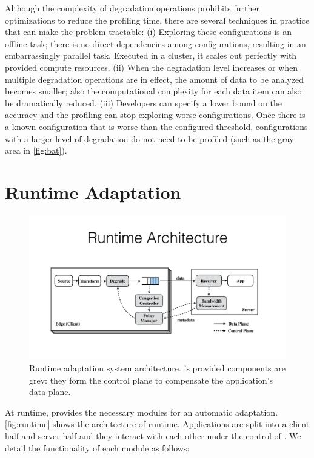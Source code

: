Although the complexity of degradation operations prohibits further
optimizations to reduce the profiling time, there are several techniques in
practice that can make the problem tractable: (i) Exploring these configurations
is an offline task; there is no direct dependencies among configurations,
resulting in an embarrassingly parallel task. Executed in a cluster, it scales
out perfectly with provided compute resources. (ii) When the degradation level
increases or when multiple degradation operations are in effect, the amount of
data to be analyzed becomes smaller; also the computational complexity for each
data item can also be dramatically reduced. (iii) Developers can specify a lower
bound on the accuracy and the profiling can stop exploring worse configurations.
Once there is a known configuration that is worse than the configured threshold,
configurations with a larger level of degradation do not need to be profiled
(such as the gray area in \autoref{fig:bat}).

\section{Runtime Adaptation}
\label{sec:adaptation}

\begin{figure}
  \centering
  \includegraphics[width=\linewidth]{figures/runtime.pdf}
  \caption{Runtime adaptation system architecture. \sysname{}'s provided
    components are grey: they form the control plane to compensate the
    application's data plane.}
  \label{fig:runtime}
\end{figure}

At runtime, \sysname{} provides the necessary modules for an automatic
adaptation. \autoref{fig:runtime} shows the architecture of \sysname{}
runtime. Applications are split into a client half and server half and they
interact with each other under the control of \sysname{}. We detail the
functionality of each module as follows:

